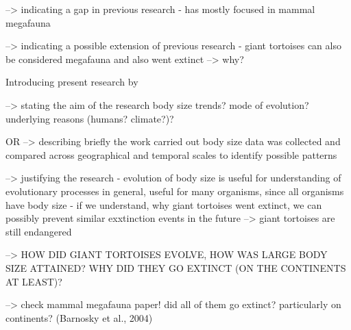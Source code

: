 --> indicating a gap in previous research
- has mostly focused in mammal megafauna

--> indicating a possible extension of previous research
- giant tortoises can also be considered megafauna and also went extinct --> why?

Introducing present research by

--> stating the aim of the research
body size trends? mode of evolution? underlying reasons (humans? climate?)?

OR 
--> describing briefly the work carried out
body size data was collected and compared across geographical and temporal scales to identify possible patterns

--> justifying the research
- evolution of body size is useful for understanding of evolutionary processes in general, useful for many organisms, since all organisms have body size
- if we understand, why giant tortoises went extinct, we can possibly prevent similar exxtinction events in the future --> giant tortoises are still endangered


--> HOW DID GIANT TORTOISES EVOLVE, HOW WAS LARGE BODY SIZE ATTAINED? WHY DID THEY GO EXTINCT (ON THE CONTINENTS AT LEAST)?


--> check mammal megafauna paper! did all of them go extinct? particularly on continents? (Barnosky et al., 2004)
